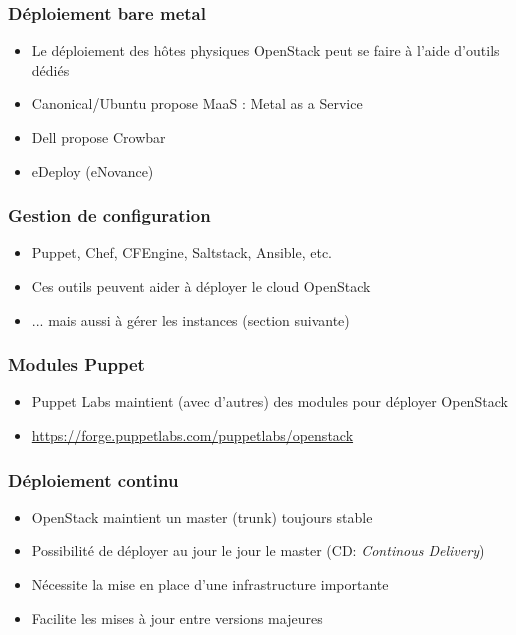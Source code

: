   \begin{frame}
    \frametitle{Déploiement bare metal}
    \begin{itemize}
      \item Le déploiement des hôtes physiques OpenStack peut se faire à l'aide d'outils dédiés\pause
      \item Canonical/Ubuntu propose MaaS : Metal as a Service
      \item Dell propose Crowbar
      \item eDeploy (eNovance)
    \end{itemize}
  \end{frame}

  \begin{frame}
    \frametitle{Gestion de configuration}
    \begin{itemize}
      \item Puppet, Chef, CFEngine, Saltstack, Ansible, etc.\pause
      \item Ces outils peuvent aider à déployer le cloud OpenStack
      \item ... mais aussi à gérer les instances (section suivante)
    \end{itemize}
  \end{frame}

  \begin{frame}
    \frametitle{Modules Puppet}
    \begin{itemize}
      \item Puppet Labs maintient (avec d'autres) des modules pour déployer OpenStack
      \item \url{https://forge.puppetlabs.com/puppetlabs/openstack}
    \end{itemize}
  \end{frame}

  \begin{frame}
    \frametitle{Déploiement continu}
    \begin{itemize}
      \item OpenStack maintient un master (trunk) toujours stable
      \item Possibilité de déployer au jour le jour le master (CD: \textit{Continous Delivery})
      \item Nécessite la mise en place d'une infrastructure importante
      \item Facilite les mises à jour entre versions majeures
    \end{itemize}
  \end{frame}

